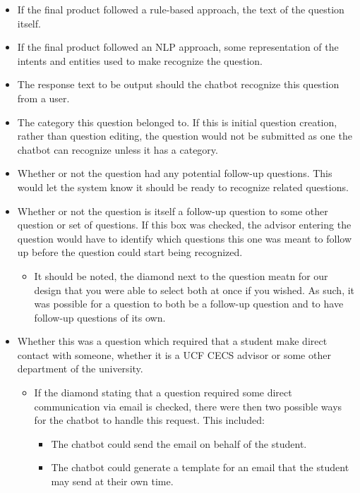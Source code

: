 \documentclass[titlepage, 12pt]{article}
\begin{document}
\begin{itemize}
    \item If the final product followed a rule-based approach, the text of the question itself.
    \item If the final product followed an NLP approach, some representation of the intents and entities used to make recognize the question.
    \item The response text to be output should the chatbot recognize this question from a user.
    \item The category this question belonged to. If this is initial question creation, rather than question editing, the question would not be submitted as one the chatbot can recognize unless it has a category. 
    \item Whether or not the question had any potential follow-up questions. This would let the system know it should be ready to recognize related questions.
    \item Whether or not the question is itself a follow-up question to some other question or set of questions. If this box was checked, the advisor entering the question would have to identify which questions this one was meant to follow up before the question could start being recognized. 
    \begin{itemize}
        \item It should be noted, the diamond next to the question meatn for our design that you were able to select both at once if you wished. As such, it was possible for a question to both be a follow-up question and to have follow-up questions of its own.
    \end{itemize}
    \item Whether this was a question which required that a student make direct contact with someone, whether it is a UCF CECS advisor or some other department of the university.
    \begin{itemize}
        \item If the diamond stating that a question required some direct communication via email is checked, there were then two possible ways for the chatbot to handle this request. This included:
        \begin{itemize}
            \item The chatbot could send the email on behalf of the student.
            \item The chatbot could generate a template for an email that the student may send at their own time.
        \end{itemize}

\end{itemize}
\end{itemize}
\end{document}
